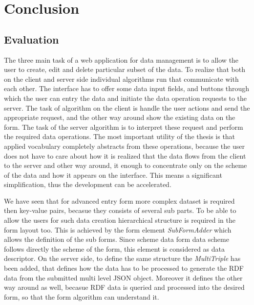 

\chapter{Conclusion}

\section{Evaluation}

The three main task of a web application for data management is to allow the user to create, edit and delete particular subset of the data. To realize that both on the client and server side individual algorithms run that communicate with each other. The interface has to offer some data input fields, and buttons through which the user can entry the data and initiate the data operation requests to the server. The task of algorithm on the client is handle the user actions and send the appropriate request, and the other way around show the existing data on the form. The task of the server algorithm is to interpret these request and perform the required data operations. The most important utility of the thesis is that applied vocabulary completely abstracts from these operations, because the user does not have to care about how it is realized that the data flows from the client to the server and other way around, it enough to concentrate only on the scheme of the data and how it appears on the interface. This means a significant simplification, thus the development can be accelerated. 
 





We have seen that for advanced entry form more complex dataset is required then key-value pairs, becasue they consists of several sub parts. To be able to allow the users for such data creation hierarchical structure is required in the form layout too. This is achieved by the form element \textit{SubFormAdder} which allows the definition of the sub forms. Since scheme data form data scheme follows directly the scheme of the form, this element is considered as data descriptor. On the server side, to define the same structure the \textit{MultiTriple} has been added, that defines how the data has to be processed to generate the RDF data from the submitted multi level JSON object. Moreover it defines the other way around as well, becasue RDF data is queried and processed into the desired form, so that the form algorithm can understand it. 




